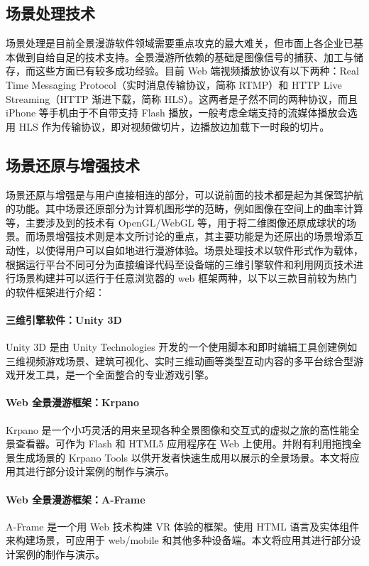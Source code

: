 \subsection{场景处理技术}
场景处理是目前全景漫游软件领域需要重点攻克的最大难关，但市面上各企业已基本做到自给自足的技术支持。全景漫游所依赖的基础是图像信号的捕获、加工与储存，而这些方面已有较多成功经验。目前 Web 端视频播放协议有以下两种：Real Time Messaging Protocol（实时消息传输协议，简称 RTMP）和 HTTP Live Streaming（HTTP 渐进下载，简称 HLS）。这两者是孑然不同的两种协议，而且 iPhone 等手机由于不自带支持 Flash 播放，一般考虑全端支持的流媒体播放会选用 HLS 作为传输协议，即对视频做切片，边播放边加载下一时段的切片。

\subsection{场景还原与增强技术}
场景还原与增强是与用户直接相连的部分，可以说前面的技术都是起为其保驾护航的功能。其中场景还原部分为计算机图形学的范畴，例如图像在空间上的曲率计算等，主要涉及到的技术有 OpenGL/WebGL 等，用于将二维图像还原成球状的场景。而场景增强技术则是本文所讨论的重点，其主要功能是为还原出的场景增添互动性，以使得用户可以自如地进行漫游体验。场景处理技术以软件形式作为载体，根据运行平台不同可分为直接编译代码至设备端的三维引擎软件和利用网页技术进行场景构建并可以运行于任意浏览器的 web 框架两种，以下以三款目前较为热门的软件框架进行介绍：

\paragraph{三维引擎软件：Unity 3D}

Unity 3D 是由 Unity Technologies 开发的一个使用脚本和即时编辑工具创建例如三维视频游戏场景、建筑可视化、实时三维动画等类型互动内容的多平台综合型游戏开发工具，是一个全面整合的专业游戏引擎。

\paragraph{Web 全景漫游框架：Krpano}
Krpano 是一个小巧灵活的用来呈现各种全景图像和交互式的虚拟之旅的高性能全景查看器。可作为 Flash 和 HTML5 应用程序在 Web 上使用。并附有利用拖拽全景生成场景的 Krpano Tools 以供开发者快速生成用以展示的全景场景。本文将应用其进行部分设计案例的制作与演示。

\paragraph{Web 全景漫游框架：A-Frame}
A-Frame 是一个用 Web 技术构建 VR 体验的框架。使用 HTML 语言及实体组件来构建场景，可应用于 web/mobile 和其他多种设备端。本文将应用其进行部分设计案例的制作与演示。


